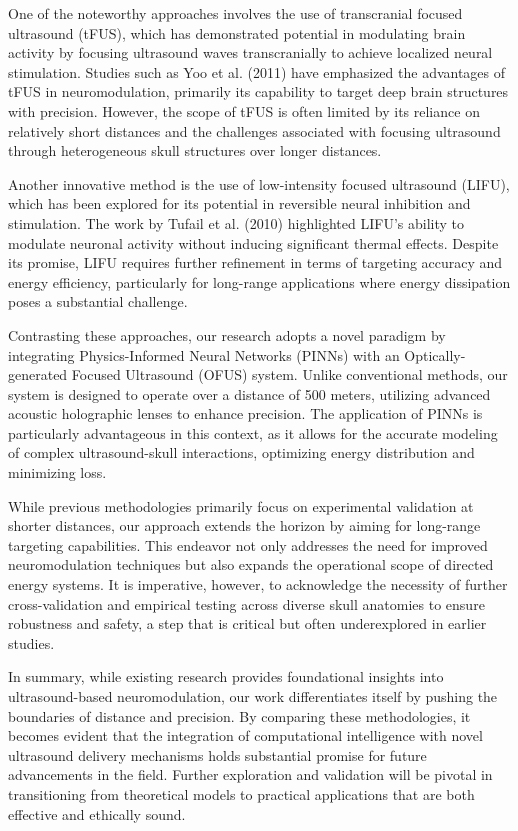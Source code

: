 \documentclass{article}
\begin{document}
One of the noteworthy approaches involves the use of transcranial focused ultrasound (tFUS), which has demonstrated potential in modulating brain activity by focusing ultrasound waves transcranially to achieve localized neural stimulation. Studies such as Yoo et al. (2011) have emphasized the advantages of tFUS in neuromodulation, primarily its capability to target deep brain structures with precision. However, the scope of tFUS is often limited by its reliance on relatively short distances and the challenges associated with focusing ultrasound through heterogeneous skull structures over longer distances.

Another innovative method is the use of low-intensity focused ultrasound (LIFU), which has been explored for its potential in reversible neural inhibition and stimulation. The work by Tufail et al. (2010) highlighted LIFU's ability to modulate neuronal activity without inducing significant thermal effects. Despite its promise, LIFU requires further refinement in terms of targeting accuracy and energy efficiency, particularly for long-range applications where energy dissipation poses a substantial challenge.

Contrasting these approaches, our research adopts a novel paradigm by integrating Physics-Informed Neural Networks (PINNs) with an Optically-generated Focused Ultrasound (OFUS) system. Unlike conventional methods, our system is designed to operate over a distance of 500 meters, utilizing advanced acoustic holographic lenses to enhance precision. The application of PINNs is particularly advantageous in this context, as it allows for the accurate modeling of complex ultrasound-skull interactions, optimizing energy distribution and minimizing loss.

While previous methodologies primarily focus on experimental validation at shorter distances, our approach extends the horizon by aiming for long-range targeting capabilities. This endeavor not only addresses the need for improved neuromodulation techniques but also expands the operational scope of directed energy systems. It is imperative, however, to acknowledge the necessity of further cross-validation and empirical testing across diverse skull anatomies to ensure robustness and safety, a step that is critical but often underexplored in earlier studies.

In summary, while existing research provides foundational insights into ultrasound-based neuromodulation, our work differentiates itself by pushing the boundaries of distance and precision. By comparing these methodologies, it becomes evident that the integration of computational intelligence with novel ultrasound delivery mechanisms holds substantial promise for future advancements in the field. Further exploration and validation will be pivotal in transitioning from theoretical models to practical applications that are both effective and ethically sound.
\end{document}
